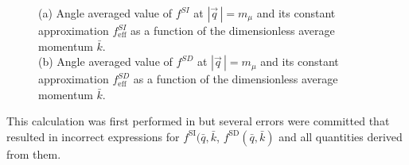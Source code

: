 \documentclass{book}[letterpaper,12pt]
\begin{document}
\begin{figure}
\centering
{}
\hfill
{}
\caption{(a) Angle averaged value of $f^{SI}$ at $|\vec{q}\,|=m_{\mu}$ and its constant approximation $f_\mathrm{eff}^{SI}$ as a function of the dimensionless average momentum $\bar{k}$. 
\\
(b) Angle averaged value of $f^{SD}$ at $|\vec{q}\,|=m_{\mu}$ and its constant approximation $f_\mathrm{eff}^{SD}$ as a function of the dimensionless average momentum $\bar{k}$.}
\label{fig:1body_f_functions}
\end{figure}


This calculation was first performed in \cite{2018PhRvC..98a5208B} but several errors were committed that resulted in incorrect expressions for $f^\mathrm{SI}(\bar{q},\bar{k}$, $f^\mathrm{SD}(\bar{q},\bar{k})$ and all quantities derived from them.
\end{document}
